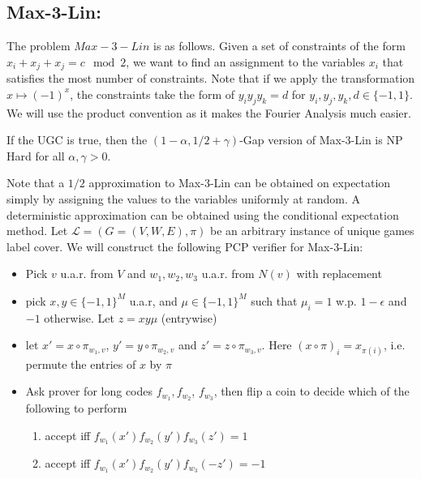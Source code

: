 \documentclass{article}
\newcommand{\1}{\mathbbm{1}}
\begin{document}
\subsection*{Max-3-Lin:}
The problem $Max-3-Lin$ is as follows. Given a set of constraints of the form $x_i + x_j + x_j = c \mod 2$, we want to find an assignment to the variables $x_i$ that satisfies the most number of constraints. Note that if we apply the transformation $x\mapsto (-1)^x$, the constraints take the form of $y_iy_jy_k = d$ for $y_i,y_j,y_k,d\in \{-1,1\}$. We will use the product convention as it makes the Fourier Analysis much easier.
\begin{theorem}
If the UGC is true, then the $(1-\alpha, 1/2+\gamma)$-Gap version of Max-3-Lin is NP Hard for all $\alpha,\gamma > 0$.
\end{theorem}
Note that a $1/2$ approximation to Max-3-Lin can be obtained on expectation simply by assigning the values to the variables uniformly at random. A deterministic approximation can be obtained using the conditional expectation method. Let $\mathcal{L} = (G=(V,W,E), \pi)$ be an arbitrary instance of unique games label cover. We will construct the following PCP verifier for Max-3-Lin:
\begin{itemize}
    \item Pick $v$ u.a.r. from $V$ and $w_1, w_2, w_3$ u.a.r. from $N(v)$ with replacement
    \item pick $x,y\in \{-1,1\}^M$ u.a.r, and $\mu\in\{-1,1\}^M$ such that $\mu_i = 1$ w.p. $1-\epsilon$ and $-1$ otherwise. Let $z=xy\mu$ (entrywise)
    \item let $x' = x\circ \pi_{w_1,v}$, $y'=y\circ \pi_{w_2, v}$ and $z'=z\circ \pi_{w_3,v}$. Here $(x \circ \pi)_i = x_{\pi(i)}$, i.e. permute the entries of $x$ by $\pi$
    \item Ask prover for long codes $f_{w_1}, f_{w_2}$, $f_{w_3}$, then flip a coin to decide which of the following to perform
    \begin{enumerate}
        \item accept iff $f_{w_1}(x')f_{w_2}(y')f_{w_3}(z') = 1$
        \item accept iff $f_{w_1}(x')f_{w_2}(y')f_{w_3}(-z') = -1$
    \end{enumerate}
\end{itemize}
\end{document}
